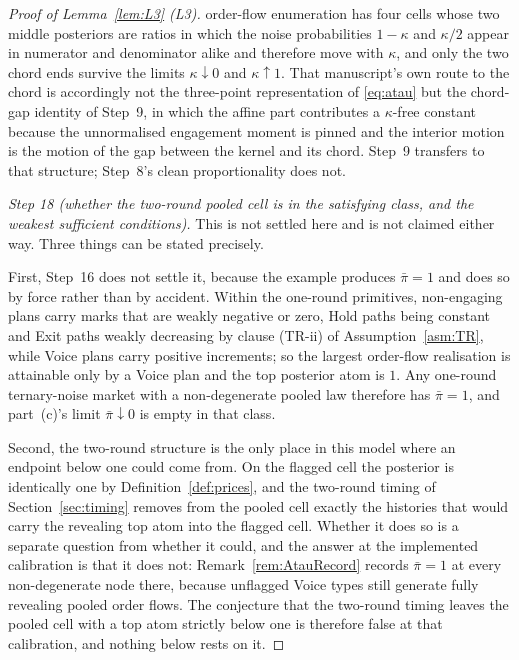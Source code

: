 \begin{proof}[Proof of Lemma~\ref{lem:L3} (L3)]
order-flow enumeration has four cells whose two middle posteriors are ratios in which the noise
probabilities $1-\kappa$ and $\kappa/2$ appear in numerator and denominator alike and therefore move
with $\kappa$, and only the two chord ends survive the limits $\kappa \downarrow 0$ and
$\kappa \uparrow 1$. That manuscript's own route to the chord is accordingly not the three-point
representation of \eqref{eq:atau} but the chord-gap identity of Step~9, in which the affine part
contributes a $\kappa$-free constant because the unnormalised engagement moment is pinned and the
interior motion is the motion of the gap between the kernel and its chord. Step~9 transfers to that
structure; Step~8's clean proportionality does not.

\emph{Step 18 (whether the two-round pooled cell is in the satisfying class, and the weakest
sufficient conditions).} This is not settled here and is not claimed either way. Three things can be
stated precisely.

First, Step~16 does not settle it, because the example produces $\bar\pi = 1$ and does so by force
rather than by accident. Within the one-round primitives, non-engaging plans carry marks that are
weakly negative or zero, Hold paths being constant and Exit paths weakly decreasing by clause (TR-ii)
of Assumption~\ref{asm:TR}, while Voice plans carry positive increments; so the largest order-flow
realisation is attainable only by a Voice plan and the top posterior atom is $1$. Any one-round
ternary-noise market with a non-degenerate pooled law therefore has $\bar\pi = 1$, and part~(c)'s
limit $\bar\pi \downarrow 0$ is empty in that class.

Second, the two-round structure is the only place in this model where an endpoint below one could
come from. On the flagged cell the posterior is identically one by Definition~\ref{def:prices}, and
the two-round timing of Section~\ref{sec:timing} removes from the pooled cell exactly the histories
that would carry the revealing top atom into the flagged cell. Whether it does so is a separate
question from whether it could, and the answer at the implemented calibration is that it does not:
Remark~\ref{rem:AtauRecord} records $\bar\pi = 1$ at every non-degenerate node there, because
unflagged Voice types still generate fully revealing pooled order flows. The conjecture that the
two-round timing leaves the pooled cell with a top atom strictly below one is therefore false at that
calibration, and nothing below rests on it.


\end{proof}
